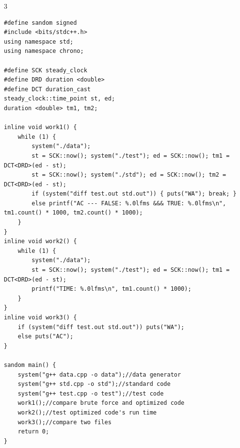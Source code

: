 \documentclass[8pt]{extarticle}
\begin{document}
\begin{multicols*}{3}
\begin{lstlisting}
#define sandom signed
#include <bits/stdc++.h>
using namespace std;
using namespace chrono;

#define SCK steady_clock
#define DRD duration <double>
#define DCT duration_cast
steady_clock::time_point st, ed;
duration <double> tm1, tm2;

inline void work1() {
    while (1) {
        system("./data");
        st = SCK::now(); system("./test"); ed = SCK::now(); tm1 = DCT<DRD>(ed - st);
        st = SCK::now(); system("./std"); ed = SCK::now(); tm2 = DCT<DRD>(ed - st);
        if (system("diff test.out std.out")) { puts("WA"); break; }
        else printf("AC --- FALSE: %.0lfms &&& TRUE: %.0lfms\n", tm1.count() * 1000, tm2.count() * 1000);
    }
}
inline void work2() {
    while (1) {
        system("./data");
        st = SCK::now(); system("./test"); ed = SCK::now(); tm1 = DCT<DRD>(ed - st);
        printf("TIME: %.0lfms\n", tm1.count() * 1000);
    }
}
inline void work3() {
    if (system("diff test.out std.out")) puts("WA");
    else puts("AC");
}

sandom main() {
    system("g++ data.cpp -o data");//data generator
    system("g++ std.cpp -o std");//standard code
    system("g++ test.cpp -o test");//test code
    work1();//compare brute force and optimized code
    work2();//test optimized code's run time
    work3();//compare two files
    return 0;
}
\end{lstlisting}
\end{multicols*}
\end{document}
